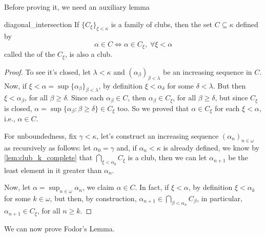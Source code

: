 Before proving it, we need an auxiliary lemma

\begin{lemma}{}{diagonal_intersection}
    If $\{C_\xi\}_{\xi<\kappa}$ is a family of clubs, then the set $C\subseteq\kappa$ defined by
    $$\alpha\in C\iff \alpha\in C_\xi,\;\forall \xi<\alpha$$
    called the  of the $C_\xi$, is also a club.
\end{lemma}

\begin{proof}
    To see it's closed, let $\lambda<\kappa$ and $(\alpha_\beta)_{\beta<\lambda}$ be an increasing sequence in $C$. Now, if $\xi<\alpha=\sup\{\alpha_\beta\}_{\beta<\lambda}$, by definition $\xi<\alpha_\delta$ for some $\delta<\lambda$. But then $\xi<\alpha_\beta$, for all $\beta\geq\delta$. Since each $\alpha_\beta\in C$, then $\alpha_\beta\in C_\xi$, for all $\beta\geq\delta$, but since $C_\xi$ is closed, $\alpha=\sup\{\alpha_\beta:\beta\geq\delta\}\in C_\xi$ too. So we proved that $\alpha\in C_\xi$ for each $\xi<\alpha$, i.e., $\alpha\in C$.

    For unboundedness, fix $\gamma<\kappa$, let's construct an increasing sequence $(\alpha_n)_{n\in\omega}$ as recursively as follows: let $\alpha_0=\gamma$ and, if $\alpha_n<\kappa$ is already defined, we know by \cref{lem:club_k_complete} that $\bigcap_{\xi<\alpha_0}C_\xi$ is a club, then we can let $\alpha_{n+1}$ be the least element in it greater than $\alpha_n$.

    Now, let $\alpha=\sup_{n\in\omega}\alpha_n$, we claim $\alpha\in C$. In fact, if $\xi<\alpha$, by definition $\xi<\alpha_k$ for some $k\in\omega$, but then, by construction, $\alpha_{n+1}\in\bigcap_{\beta<\alpha_n}C_\beta$, in particular, $\alpha_{n+1}\in C_\xi$, for all $n\geq k$.
\end{proof}

We can now prove Fodor's Lemma.

